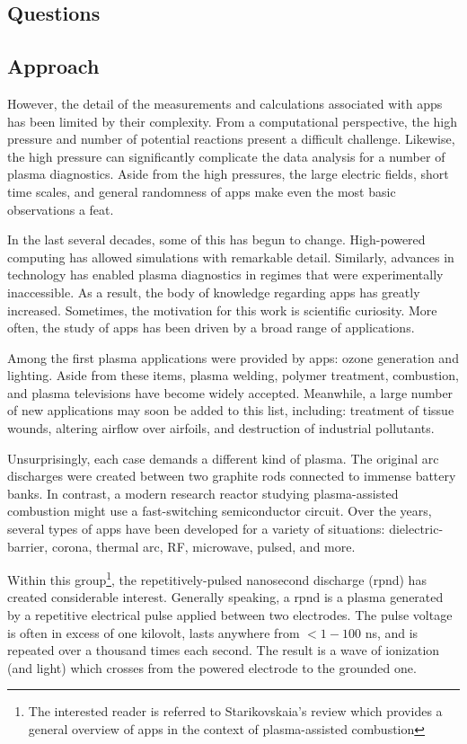\subsection{Questions}

\subsection{Approach}

However, the detail of the measurements and calculations
associated with \acs{app}s has been limited by their complexity. From a
computational perspective, the high pressure and number of potential reactions
present a difficult challenge. Likewise, the high pressure can significantly
complicate the data analysis for a number of plasma diagnostics. Aside from the
high pressures, the large electric fields, short time scales, and general
randomness of \acs{app}s make even the most basic observations a feat.

In the last several decades, some of this has begun to change. High-powered
computing has allowed simulations with remarkable detail. Similarly, advances in
technology has enabled plasma diagnostics in regimes that were experimentally
inaccessible. As a result, the body of knowledge regarding \acs{app}s has
greatly increased. Sometimes, the motivation for this work is scientific
curiosity. More often, the study of \acs{app}s has been driven by a broad range
of applications.

Among the first plasma applications were provided by \acs{app}s: ozone
generation and lighting. Aside from these items, plasma welding, polymer
treatment, combustion, and plasma televisions have become widely accepted.
Meanwhile, a large number of new applications may soon be added to this list,
including: treatment of tissue wounds, altering airflow over airfoils, and
destruction of industrial pollutants.

Unsurprisingly, each case demands a different kind of plasma. The original arc
discharges were created between two graphite rods connected to immense battery
banks. In contrast, a modern research reactor studying plasma-assisted
combustion might use a fast-switching semiconductor circuit. Over the years,
several types of \acs{app}s have been developed for a variety of situations:
dielectric-barrier, corona, thermal arc, RF, microwave, pulsed, and more.

Within this group\footnote{The interested reader is referred to Starikovskaia's
review \cite{Starikovskaia2006} which provides a general overview of \acs{app}s
in the context of plasma-assisted combustion}, the repetitively-pulsed
nanosecond discharge (\acs{rpnd}) has created considerable interest. Generally
speaking, a \acs{rpnd} is a plasma generated by a repetitive electrical pulse
applied between two electrodes. The pulse voltage is often in excess of one
kilovolt, lasts anywhere from $<1-100$ ns, and is repeated over a thousand
times each second. The result is a wave of ionization (and light) which crosses
from the powered electrode to the grounded one.

